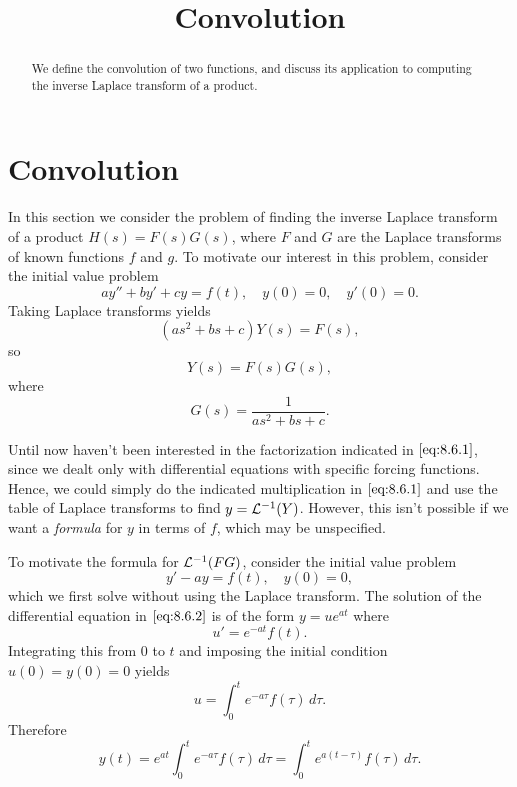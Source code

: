 \documentclass{ximera}
\title{Convolution}%
\begin{document}
\begin{abstract}
We define the convolution of two functions, and discuss its application to computing the inverse Laplace transform of a product.
\end{abstract}

\maketitle

\section*{Convolution}

In this section we consider the problem of finding the inverse Laplace
transform of a product $H(s)=F(s)G(s)$, where $F$ and $G$ are the
Laplace transforms of known functions $f$ and $g$. To motivate our
interest in this problem, consider the initial value problem
$$
ay''+by'+cy=f(t),\quad y(0)=0,\quad y'(0)=0.
$$
Taking Laplace transforms  yields
$$
(as^2+bs+c)Y(s)=F(s),
$$
so
\begin{equation}\label{eq:8.6.1}
Y(s)=F(s)G(s),
\end{equation}
where
$$
G(s)=\frac{1}{as^2+bs+c}.
$$

Until now haven't been interested in the factorization indicated
in $\eqref{eq:8.6.1}$, since we dealt only with differential equations
with specific forcing functions. Hence, we could simply do the
indicated multiplication in $\eqref{eq:8.6.1}$ and use the table of Laplace
transforms to find $y={\cal L}^{-1}(Y)$. However, this isn't  possible
if we want a \textit{formula} for $y$ in terms of $f$, which may be
unspecified.

To motivate the formula for ${\cal L}^{-1}(FG)$, consider the initial
value problem
\begin{equation}\label{eq:8.6.2}
y'-ay=f(t),\quad  y(0)=0,
\end{equation}
which we first solve without using the Laplace transform.
The solution of  the differential equation in $\eqref{eq:8.6.2}$
is of the form $y=ue^{at}$ where
$$
u'=e^{-at}f(t).
$$
Integrating this from $0$ to $t$ and imposing the initial condition
$u(0)=y(0)=0$ yields
$$
u=\int_0^t e^{-a\tau}f(\tau)\,d\tau.
$$
Therefore
\begin{equation}\label{eq:8.6.3}
y(t)=e^{at}\int_0^t e^{-a\tau}f(\tau)\,d\tau=\int_0^t
e^{a(t-\tau)}f(\tau)\,d\tau.
\end{equation}
\end{document}
